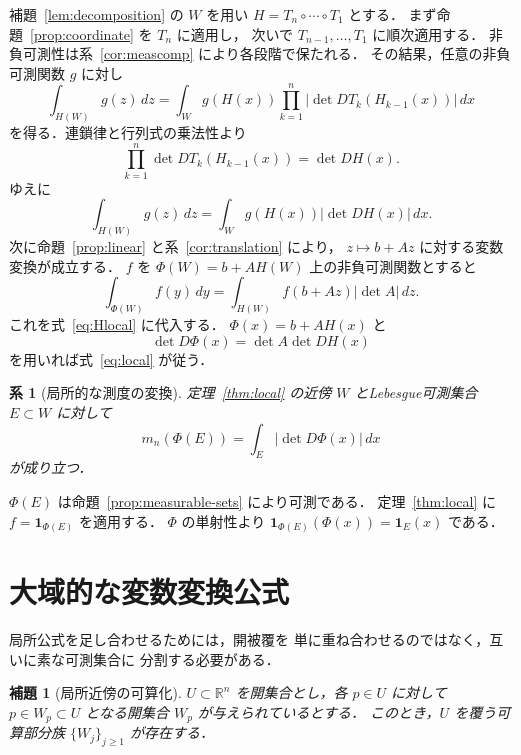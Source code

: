 \documentclass[a5paper,10pt,onecolumn]{jsarticle}
\makeatletter
\theoremstyle{mathnotetheorem}
\newtheorem{lemma}[theorem]{補題}
\newtheorem{corollary}[theorem]{系}
\renewcommand{\proofname}{証明}
\renewenvironment{proof}[1][\proofname]{%
  \par\pushQED{\qed}\normalfont\topsep4\p@\@plus2\p@\relax
  \trivlist\item[\hskip\labelsep\bfseries #1]\ignorespaces
}{\popQED\endtrivlist\@endpefalse}
\newcommand{\R}{\mathbb{R}}
\newcommand{\abs}[1]{\lvert #1\rvert}
\makeatother
\begin{document}
\begin{proof}
補題~\ref{lem:decomposition} の $W$ を用い
$H=T_n\circ\cdots\circ T_1$ とする．
まず命題~\ref{prop:coordinate} を $T_n$ に適用し，
次いで $T_{n-1},\ldots,T_1$ に順次適用する．
非負可測性は系~\ref{cor:meascomp} により各段階で保たれる．
その結果，任意の非負可測関数 $g$ に対し
\[
 \int_{H(W)}g(z)\,dz
 =\int_W g(H(x))
 \prod_{k=1}^{n}\abs{\det DT_k(H_{k-1}(x))}\,dx
\]
を得る．連鎖律と行列式の乗法性より
\[
 \prod_{k=1}^{n}\det DT_k(H_{k-1}(x))
 =\det DH(x).
\]
ゆえに
\begin{equation}\label{eq:Hlocal}
 \int_{H(W)}g(z)\,dz
 =\int_W g(H(x))\abs{\det DH(x)}\,dx.
\end{equation}
次に命題~\ref{prop:linear} と系~\ref{cor:translation} により，
$z\mapsto b+Az$ に対する変数変換が成立する．
$f$ を $\Phi(W)=b+AH(W)$ 上の非負可測関数とすると
\[
 \int_{\Phi(W)}f(y)\,dy
 =\int_{H(W)}f(b+Az)\abs{\det A}\,dz.
\]
これを式~\eqref{eq:Hlocal} に代入する．
$\Phi(x)=b+AH(x)$ と
\[
 \det D\Phi(x)=\det A\det DH(x)
\]
を用いれば式~\eqref{eq:local} が従う．
\end{proof}

\begin{corollary}[局所的な測度の変換]\label{cor:measurelocal}
定理~\ref{thm:local} の近傍 $W$ とLebesgue可測集合
$E\subset W$ に対して
\[
 m_n(\Phi(E))=\int_E\abs{\det D\Phi(x)}\,dx
\]
が成り立つ．
\end{corollary}

\begin{proof}
$\Phi(E)$ は命題~\ref{prop:measurable-sets} により可測である．
定理~\ref{thm:local} に $f=\mathbf1_{\Phi(E)}$ を適用する．
$\Phi$ の単射性より
$\mathbf1_{\Phi(E)}(\Phi(x))=\mathbf1_E(x)$ である．
\end{proof}

\section{大域的な変数変換公式}\label{sec:global}

局所公式を足し合わせるためには，開被覆を
単に重ね合わせるのではなく，互いに素な可測集合に
分割する必要がある．

\begin{lemma}[局所近傍の可算化]\label{lem:countablecover}
$U\subset\R^n$ を開集合とし，各 $p\in U$ に対して
$p\in W_p\subset U$ となる開集合 $W_p$ が与えられているとする．
このとき，$U$ を覆う可算部分族
$\{W_j\}_{j\ge1}$ が存在する．
\end{lemma}
\end{document}
